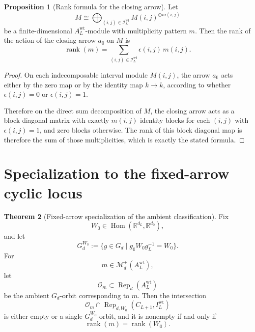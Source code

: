\documentclass{article}
\newcommand{\rk}{\operatorname{rank}}
\newcommand{\R}{\mathbb{R}}
\newcommand{\Hom}{\operatorname{Hom}}
\newcommand{\Rep}{\operatorname{Rep}}
\theoremstyle{definition}
\newtheorem{theorem}{Theorem}[section]
\newtheorem{proposition}[theorem]{Proposition}
\begin{document}
\begin{proposition}[Rank formula for the closing arrow]
\label{prop:task5-rank-formula}
Let
\[
M
\cong
\bigoplus_{(i,j)\in \mathcal I_L^{\mathrm{wt}}}
M(i,j)^{\oplus m(i,j)}
\]
be a finite-dimensional $A_L^{\mathrm{wt}}$-module with multiplicity pattern
$m$. Then the rank of the action of the closing arrow $a_0$ on $M$ is
\[
\rk(m)
=
\sum_{(i,j)\in \mathcal I_L^{\mathrm{wt}}}
\epsilon(i,j)\,m(i,j).
\]
\end{proposition}

\begin{proof}
On each indecomposable interval module $M(i,j)$, the arrow $a_0$ acts either by
the zero map or by the identity map $k\to k$, according to whether
$\epsilon(i,j)=0$ or $\epsilon(i,j)=1$.

Therefore on the direct sum decomposition of $M$, the closing arrow acts as a
block diagonal matrix with exactly $m(i,j)$ identity blocks for each
$(i,j)$ with $\epsilon(i,j)=1$, and zero blocks otherwise. The rank of this
block diagonal map is therefore the sum of those multiplicities, which is
exactly the stated formula.
\end{proof}

\section{Specialization to the fixed-arrow cyclic locus}

\begin{theorem}[Fixed-arrow specialization of the ambient classification]
\label{thm:task5-fixed-arrow-specialization}
Fix
\[
W_0\in \Hom(\R^{d_L},\R^{d_0}),
\]
and let
\[
G_d^{W_0}
:=
\{g\in G_d\mid g_0W_0g_L^{-1}=W_0\}.
\]
For
\[
m\in \mathcal M_d^+(A_L^{\mathrm{wt}}),
\]
let
\[
\mathcal O_m\subset \Rep_d(A_L^{\mathrm{wt}})
\]
be the ambient $G_d$-orbit corresponding to $m$. Then the intersection
\[
\mathcal O_m\cap \Rep_{d,W_0}(C_{L+1},I_L^{\mathrm{wt}})
\]
is either empty or a single $G_d^{W_0}$-orbit, and it is nonempty if and only
if
\[
\rk(m)=\rk(W_0).
\]
\end{theorem}
\end{document}
